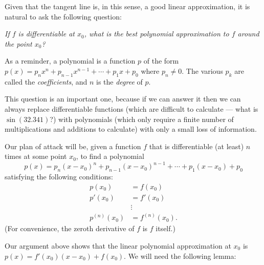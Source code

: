 Given that the tangent line is, in this sense, a good linear approximation, it is natural to ask the following question:
\begin{center}\itshape
  If $ f $ is differentiable at $ x_0 $, what is the best polynomial approximation to $ f $ around the point $ x_0 $?
\end{center}

As a reminder, a polynomial is a function $ p $ of the form $ p(x) = p_n x^n + p_{n - 1} x^{n - 1} + \cdots + p_1 x + p_0 $
where $ p_n \neq 0 $. The various $ p_k $ are called the \emph{coefficients}, and $ n $ is the \emph{degree} of $ p $.

This question is an important one, because if we can answer it then we can always replace differentiable functions (which
are difficult to calculate --- what is $ \sin(32.341) $?) with polynomials (which only require a finite number of multiplications
and additions to calculate) with only a small loss of information.

Our plan of attack will be, given a function $ f $ that is differentiable (at least) $ n $ times at some point $ x_0 $,
to find a polynomial
\begin{displaymath}
  p(x) = p_n (x - x_0)^n + p_{n - 1} (x - x_0)^{n -1} + \cdots + p_1 (x - x_0) + p_0
\end{displaymath}
satisfying the following conditions:
\begin{align*}
  p(x_0) &= f(x_0)\\
  p'(x_0) &= f'(x_0)\\
  &\vdots\\
  p^{(n)}(x_0) &= f^{(n)}(x_0).
\end{align*}
(For convenience, the zeroth derivative of $ f $ is $ f $ itself.)

Our argument above shows that the linear polynomial approximation at $ x_0 $ is $ p(x) = f'(x_0)(x - x_0) + f(x_0) $. We will need the following lemma:

